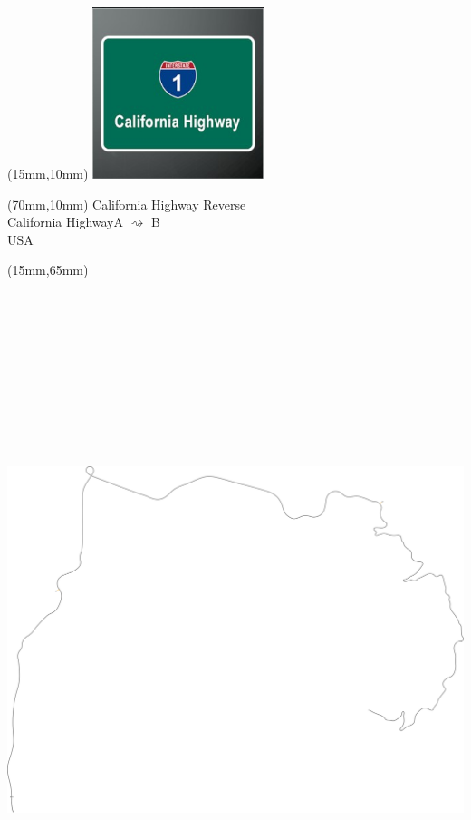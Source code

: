 \null\newpage
\begin{textblock*}{50mm}(15mm,10mm)%
\includegraphics[width=50mm]{LG/2015-05-20_00077.png}
\end{textblock*}
\begin{textblock*}{130mm}(70mm,10mm)%
{\fontsize{20}{20}\selectfont California Highway Reverse\\}
{\fontsize{16}{16}\selectfont California Highway\hfill A $\rightsquigarrow$ B\\}
{\fontsize{12}{12}\selectfont USA\\}
\end{textblock*}
\begin{textblock*}{185mm}(15mm,65mm)%
\centering
\mbox{\includegraphics[width=185mm,height=210mm,keepaspectratio]{PT/CAHIRE.pdf}}
\end{textblock*}
